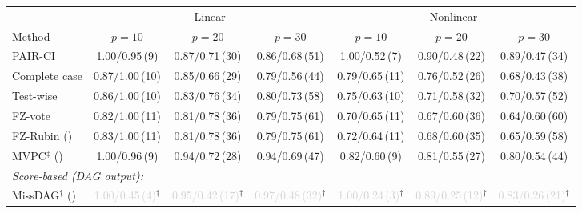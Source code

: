 \begin{tabular}{lcccccc}
    \toprule
                  & \multicolumn{3}{c}{Linear} & \multicolumn{3}{c}{Nonlinear} \\
    \cmidrule(lr){2-4} \cmidrule(lr){5-7}
    Method        & $p{=}10$ & $p{=}20$ & $p{=}30$ & $p{=}10$ & $p{=}20$ & $p{=}30$ \\
    \midrule
    PAIR-CI                                       & 1.00/0.95\,{\scriptsize(9)} & 0.87/0.71\,{\scriptsize(30)} & 0.86/0.68\,{\scriptsize(51)} & 1.00/0.52\,{\scriptsize(7)} & 0.90/0.48\,{\scriptsize(22)} & 0.89/0.47\,{\scriptsize(34)} \\
    Complete case                                 & 0.87/1.00\,{\scriptsize(10)} & 0.85/0.66\,{\scriptsize(29)} & 0.79/0.56\,{\scriptsize(44)} & 0.79/0.65\,{\scriptsize(11)} & 0.76/0.52\,{\scriptsize(26)} & 0.68/0.43\,{\scriptsize(38)} \\
    Test-wise                                     & 0.86/1.00\,{\scriptsize(10)} & 0.83/0.76\,{\scriptsize(34)} & 0.80/0.73\,{\scriptsize(58)} & 0.75/0.63\,{\scriptsize(10)} & 0.71/0.58\,{\scriptsize(32)} & 0.70/0.57\,{\scriptsize(52)} \\
    FZ-vote                                       & 0.82/1.00\,{\scriptsize(11)} & 0.81/0.78\,{\scriptsize(36)} & 0.79/0.75\,{\scriptsize(61)} & 0.70/0.65\,{\scriptsize(11)} & 0.67/0.60\,{\scriptsize(36)} & 0.64/0.60\,{\scriptsize(60)} \\
    FZ-Rubin (\citeauthor{witte2022multiple})     & 0.83/1.00\,{\scriptsize(11)} & 0.81/0.78\,{\scriptsize(36)} & 0.79/0.75\,{\scriptsize(61)} & 0.72/0.64\,{\scriptsize(11)} & 0.68/0.60\,{\scriptsize(35)} & 0.65/0.59\,{\scriptsize(58)} \\
    MVPC$^\ddagger$ (\citeauthor{tu2019causal})   & 1.00/0.96\,{\scriptsize(9)} & 0.94/0.72\,{\scriptsize(28)} & 0.94/0.69\,{\scriptsize(47)} & 0.82/0.60\,{\scriptsize(9)} & 0.81/0.55\,{\scriptsize(27)} & 0.80/0.54\,{\scriptsize(44)} \\
    \midrule
    \multicolumn{7}{l}{\emph{Score-based (DAG output):}} \\
    MissDAG$^\dagger$ (\citeauthor{gao2022missdag}) & \textcolor{lightgray}{1.00/0.45\,{\scriptsize(4)}}$^\dagger$ & \textcolor{lightgray}{0.95/0.42\,{\scriptsize(17)}}$^\dagger$ & \textcolor{lightgray}{0.97/0.48\,{\scriptsize(32)}}$^\dagger$ & \textcolor{lightgray}{1.00/0.24\,{\scriptsize(3)}}$^\dagger$ & \textcolor{lightgray}{0.89/0.25\,{\scriptsize(12)}}$^\dagger$ & \textcolor{lightgray}{0.83/0.26\,{\scriptsize(21)}}$^\dagger$ \\
    \bottomrule
\end{tabular}
